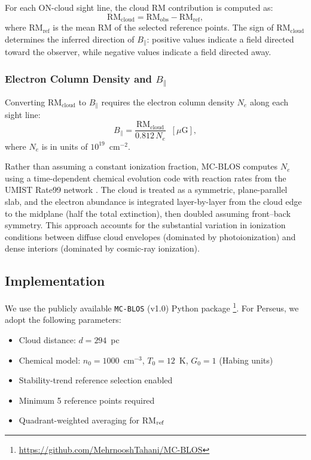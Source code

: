 \documentclass[twocolumn]{aastex701}
\begin{document}
For each ON-cloud sight line, the cloud RM contribution is computed as:
\begin{equation}
    \mathrm{RM_{cloud}} = \mathrm{RM_{obs}} - \mathrm{RM_{ref}},
\end{equation}
where $\mathrm{RM_{ref}}$ is the mean RM of the selected reference points. The sign of $\mathrm{RM_{cloud}}$ determines the inferred direction of $B_\parallel$: positive values indicate a field directed toward the observer, while negative values indicate a field directed away.

\subsubsection{Electron Column Density and $B_\parallel$}

Converting $\mathrm{RM_{cloud}}$ to $B_\parallel$ requires the electron column density $N_e$ along each sight line:
\begin{equation}
    B_\parallel = \frac{\mathrm{RM_{cloud}}}{0.812 \, N_e} \;\; [\mu\mathrm{G}],
\end{equation}
where $N_e$ is in units of $10^{19}$~cm$^{-2}$.

Rather than assuming a constant ionization fraction, MC-BLOS computes $N_e$ using a time-dependent chemical evolution code \citep{gibson2009} with reaction rates from the UMIST Rate99 network \citep{leteuff2000}. The cloud is treated as a symmetric, plane-parallel slab, and the electron abundance is integrated layer-by-layer from the cloud edge to the midplane (half the total extinction), then doubled assuming front--back symmetry. This approach accounts for the substantial variation in ionization conditions between diffuse cloud envelopes (dominated by photoionization) and dense interiors (dominated by cosmic-ray ionization).

\subsection{Implementation}

We use the publicly available \texttt{MC-BLOS} (v1.0) Python package \citep{tahani2025mcblos}\footnote{\url{https://github.com/MehrnooshTahani/MC-BLOS}}. For Perseus, we adopt the following parameters:
\begin{itemize}
    \item Cloud distance: $d = 294$~pc \citep{zucker2018}
    \item Chemical model: $n_0 = 1000$~cm$^{-3}$, $T_0 = 12$~K, $G_0 = 1$ (Habing units)
    \item Stability-trend reference selection enabled
    \item Minimum 5 reference points required
    \item Quadrant-weighted averaging for RM$_{\rm ref}$
\end{itemize}
\end{document}
